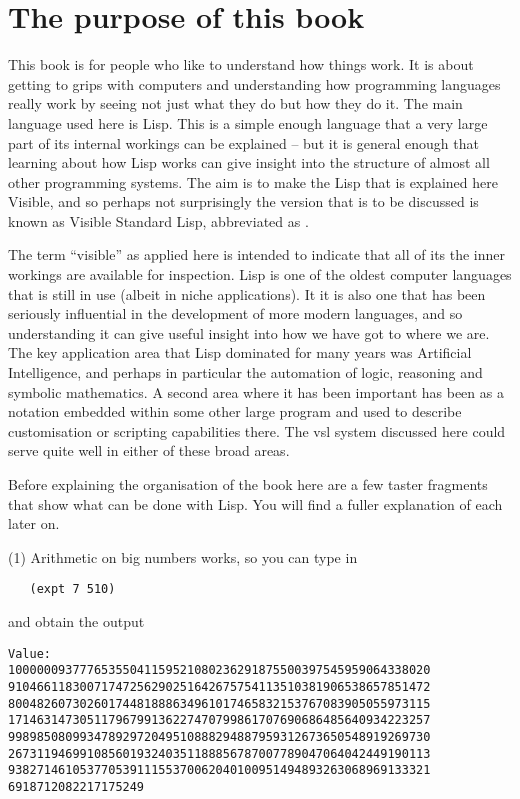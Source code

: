 \chapter{The purpose of this book}
This book is for people who like to understand how things work. It is
about getting to grips with computers and understanding how programming
languages really work by seeing not just what they do but how they do it.
The main language used here is Lisp. This is a simple enough language
that a very large part of its internal workings can be explained -- but
it is general enough that learning about how Lisp works can give insight
into the structure of almost all other programming systems. The aim
is to make the Lisp that is explained here Visible, and so perhaps
not surprisingly the version that is to be discussed is known as
Visible Standard Lisp, abbreviated as \vsl.

The term ``visible'' as applied here is intended
to indicate that all of its the inner workings are available for
inspection.  Lisp is one of the oldest
computer languages that is still in use (albeit in niche applications). It
it is also one that has been seriously influential in the development
of more modern languages, and so understanding it can give useful insight
into how we have got to where we are. The key application area that Lisp
dominated for many years was Artificial Intelligence, and perhaps in particular
the automation of logic, reasoning and symbolic mathematics. A second area
where it has been important has been as a notation embedded within some
other large program and used to describe customisation or scripting
capabilities there. The vsl{} system discussed here could serve quite
well in either of these broad areas.

Before explaining the organisation of the book here are a few taster
fragments that show what can be done with Lisp. You will find a fuller
explanation of each later on.

\setlength{\oddsidemargin}{1cm}
\setlength{\evensidemargin}{1cm}
(1) Arithmetic on big numbers works, so you can type in
{\small\begin{verbatim}
   (expt 7 510)
\end{verbatim}}
and obtain the output
{\small\begin{verbatim}
Value:
10000009377765355041159521080236291875500397545959064338020
91046611830071747256290251642675754113510381906538657851472
80048260730260174481888634961017465832153767083905055973115
17146314730511796799136227470799861707690686485640934223257
99898508099347892972049510888294887959312673650548919269730
26731194699108560193240351188856787007789047064042449190113
93827146105377053911155370062040100951494893263068969133321
6918712082217175249
\end{verbatim}}

